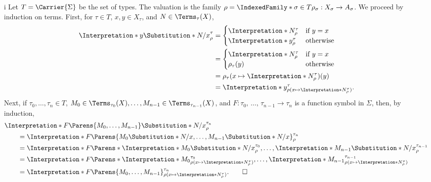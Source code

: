 \begin{partsolution}{i}
Let \(T = \Carrier{\Sigma}\) be the set of types. The valuation is the family \(\rho = \IndexedFamily*{\sigma \in T}{\rho_\sigma : X_\sigma \to A_\sigma}\).
We proceed by induction on terms.
First, for \(\tau\in T\), \(x, y \in X_\tau\), and \(N \in \Terms_\tau(X)\),
\begin{align*}
\Interpretation*{y\Substitution*{N/x}}_\rho^\tau
&=\begin{cases}
\Interpretation*{N}_\rho^\tau & \text{if \(y = x\)} \\
\Interpretation*{y}_\rho^\tau & \text{otherwise}
\end{cases} \\
&=\begin{cases}
\Interpretation*{N}_\rho^\tau & \text{if \(y = x\)} \\
\rho_\tau(y) & \text{otherwise}
\end{cases} \\
&= \rho_\tau(x \mapsto \Interpretation*{N}_\rho^\tau)(y) \\
&=\Interpretation*{y}_{\rho(x \mapsto \Interpretation*{N}_\rho^\tau)}^\tau.
\end{align*}
Next, if \(\tau_0,\ldots,\tau_n\in T\), \(M_0 \in \Terms_{\tau_0}(X), \ldots, M_{n-1} \in \Terms_{\tau_{n-1}}(X)\), and \(F : \tau_0,\,\ldots,\,\tau_{n-1} \to \tau_n\) is a function symbol in \(\Sigma\), then, by induction,
\begin{align*}
&\Interpretation*{F\Parens{M_0,\ldots,M_{n-1}}\Substitution*{N/x}}_\rho^{\tau_n} \\
&\qquad=\Interpretation*{F\Parens{M_0\Substitution*{N/x},\ldots,M_{n-1}\Substitution*{N/x}}}_\rho^{\tau_n} \\
&\qquad=\Interpretation*{F}\Parens*{\Interpretation*{M_0\Substitution*{N/x}}_\rho^{\tau_0},\ldots,\Interpretation*{M_{n-1}\Substitution*{N/x}}_\rho^{\tau_{n-1}}} \\
&\qquad=\Interpretation*{F}\Parens*{\Interpretation*{M_0}_{\rho(x \mapsto \Interpretation*{N}_\rho^\tau)}^{\tau_0},\ldots,\Interpretation*{M_{n-1}}_{\rho(x \mapsto \Interpretation*{N}_\rho^\tau)}^{\tau_{n-1}}} \\
&\qquad=\Interpretation*{F\Parens{M_0,\ldots,M_{n-1}}}_{\rho(x \mapsto \Interpretation*{N}_\rho^\tau)}^{\tau_n}.
\qedhere
\end{align*}
\end{partsolution}

